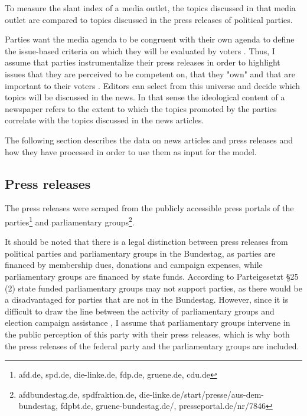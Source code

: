\documentclass[12pt,a4paper,notitlepage]{article}
\begin{document}
To measure the slant index of a media outlet, the topics discussed in that media outlet are compared to topics discussed in the press releases of political parties. 

Parties want the media agenda to be congruent with their own agenda to define the issue-based criteria on which they will be evaluated by voters \citep{eberl_one_2017, brandenburg_political_2005}. Thus, I assume that parties instrumentalize their press releases in order to highlight issues that they are perceived to be competent on, that they "own" and that are important to their voters \citep{kepplinger_einfluss_2004}. Editors can select from this universe and decide which topics will be discussed in the news. In that sense the ideological content of a newspaper refers to the extent to which the topics promoted by the parties correlate with the topics discussed in the news articles. 


The following section describes the data on news articles and press releases and how they have processed in order to use them as input for the model.

\subsection{Press releases}\label{ch_press}

The press releases were scraped from the publicly accessible press portals of the parties\footnote{afd.de, spd.de, die-linke.de, fdp.de, gruene.de, cdu.de} and parliamentary groups\footnote{afdbundestag.de, spdfraktion.de, die-linke.de/start/presse/aus-dem-bundestag, fdpbt.de, gruene-bundestag.de/, presseportal.de/nr/7846}. 

It should be noted that there is a legal distinction between press releases from political parties and parliamentary groups in the Bundestag, as parties are financed by membership dues, donations and campaign expenses, while parliamentary groups are financed by state funds. According to Parteigesetzt §25 (2) state funded parliamentary groups may not support parties, as there would be a disadvantaged for parties that are not in the Bundestag. However, since it is difficult to draw the line between the activity of parliamentary groups and election campaign assistance \citep{kepplinger_einfluss_2004}, I assume that parliamentary groups intervene in the public perception of this party with their press releases, which is why both the press releases of the federal party and the parliamentary groups are included.
\end{document}
